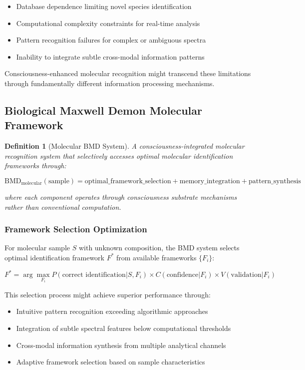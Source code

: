\documentclass[11pt,a4paper]{article}
\newtheorem{definition}[theorem]{Definition}
\theoremstyle{remark}
\begin{document}
\begin{itemize}
\item Database dependence limiting novel species identification
\item Computational complexity constraints for real-time analysis
\item Pattern recognition failures for complex or ambiguous spectra
\item Inability to integrate subtle cross-modal information patterns
\end{itemize}

Consciousness-enhanced molecular recognition might transcend these limitations through fundamentally different information processing mechanisms.

\subsection{Biological Maxwell Demon Molecular Framework}

\begin{definition}[Molecular BMD System]
A consciousness-integrated molecular recognition system that selectively accesses optimal molecular identification frameworks through:

$$\text{BMD}_{\text{molecular}}(\text{sample}) = \text{optimal\_framework\_selection} + \text{memory\_integration} + \text{pattern\_synthesis}$$

where each component operates through consciousness substrate mechanisms rather than conventional computation.
\end{definition}

\subsubsection{Framework Selection Optimization}

For molecular sample $S$ with unknown composition, the BMD system selects optimal identification framework $F^*$ from available frameworks $\{F_i\}$:

$$F^* = \arg\max_{F_i} P(\text{correct identification}|S, F_i) \times C(\text{confidence}|F_i) \times V(\text{validation}|F_i)$$

This selection process might achieve superior performance through:
\begin{itemize}
\item Intuitive pattern recognition exceeding algorithmic approaches
\item Integration of subtle spectral features below computational thresholds
\item Cross-modal information synthesis from multiple analytical channels
\item Adaptive framework selection based on sample characteristics
\end{itemize}
\end{document}
